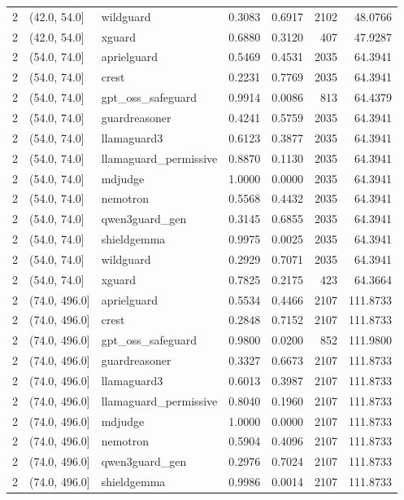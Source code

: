 \begin{tabular}{rllrrrr}
2 & (42.0, 54.0] & wildguard & 0.3083 & 0.6917 & 2102 & 48.0766 \\
2 & (42.0, 54.0] & xguard & 0.6880 & 0.3120 & 407 & 47.9287 \\
2 & (54.0, 74.0] & aprielguard & 0.5469 & 0.4531 & 2035 & 64.3941 \\
2 & (54.0, 74.0] & crest & 0.2231 & 0.7769 & 2035 & 64.3941 \\
2 & (54.0, 74.0] & gpt\_oss\_safeguard & 0.9914 & 0.0086 & 813 & 64.4379 \\
2 & (54.0, 74.0] & guardreasoner & 0.4241 & 0.5759 & 2035 & 64.3941 \\
2 & (54.0, 74.0] & llamaguard3 & 0.6123 & 0.3877 & 2035 & 64.3941 \\
2 & (54.0, 74.0] & llamaguard\_permissive & 0.8870 & 0.1130 & 2035 & 64.3941 \\
2 & (54.0, 74.0] & mdjudge & 1.0000 & 0.0000 & 2035 & 64.3941 \\
2 & (54.0, 74.0] & nemotron & 0.5568 & 0.4432 & 2035 & 64.3941 \\
2 & (54.0, 74.0] & qwen3guard\_gen & 0.3145 & 0.6855 & 2035 & 64.3941 \\
2 & (54.0, 74.0] & shieldgemma & 0.9975 & 0.0025 & 2035 & 64.3941 \\
2 & (54.0, 74.0] & wildguard & 0.2929 & 0.7071 & 2035 & 64.3941 \\
2 & (54.0, 74.0] & xguard & 0.7825 & 0.2175 & 423 & 64.3664 \\
2 & (74.0, 496.0] & aprielguard & 0.5534 & 0.4466 & 2107 & 111.8733 \\
2 & (74.0, 496.0] & crest & 0.2848 & 0.7152 & 2107 & 111.8733 \\
2 & (74.0, 496.0] & gpt\_oss\_safeguard & 0.9800 & 0.0200 & 852 & 111.9800 \\
2 & (74.0, 496.0] & guardreasoner & 0.3327 & 0.6673 & 2107 & 111.8733 \\
2 & (74.0, 496.0] & llamaguard3 & 0.6013 & 0.3987 & 2107 & 111.8733 \\
2 & (74.0, 496.0] & llamaguard\_permissive & 0.8040 & 0.1960 & 2107 & 111.8733 \\
2 & (74.0, 496.0] & mdjudge & 1.0000 & 0.0000 & 2107 & 111.8733 \\
2 & (74.0, 496.0] & nemotron & 0.5904 & 0.4096 & 2107 & 111.8733 \\
2 & (74.0, 496.0] & qwen3guard\_gen & 0.2976 & 0.7024 & 2107 & 111.8733 \\
2 & (74.0, 496.0] & shieldgemma & 0.9986 & 0.0014 & 2107 & 111.8733 \\

\end{tabular}
